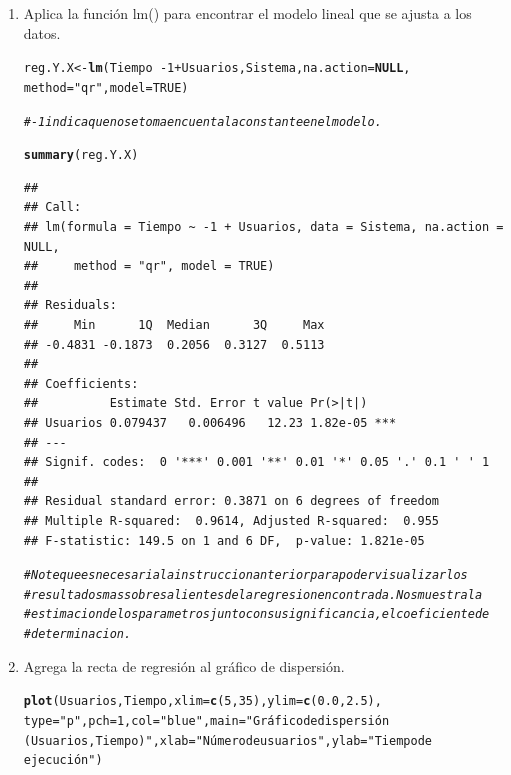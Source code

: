 \documentclass[12pt,letterpaper]{article}\usepackage[]{graphicx}\usepackage[]{color}
\makeatletter
\newcommand{\hlnum}[1]{\textcolor[rgb]{0.686,0.059,0.569}{#1}}%
\newcommand{\hlstr}[1]{\textcolor[rgb]{0.192,0.494,0.8}{#1}}%
\newcommand{\hlcom}[1]{\textcolor[rgb]{0.678,0.584,0.686}{\textit{#1}}}%
\newcommand{\hlopt}[1]{\textcolor[rgb]{0,0,0}{#1}}%
\newcommand{\hlstd}[1]{\textcolor[rgb]{0.345,0.345,0.345}{#1}}%
\newcommand{\hlkwa}[1]{\textcolor[rgb]{0.161,0.373,0.58}{\textbf{#1}}}%
\newcommand{\hlkwb}[1]{\textcolor[rgb]{0.69,0.353,0.396}{#1}}%
\newcommand{\hlkwc}[1]{\textcolor[rgb]{0.333,0.667,0.333}{#1}}%
\newcommand{\hlkwd}[1]{\textcolor[rgb]{0.737,0.353,0.396}{\textbf{#1}}}%
\newenvironment{kframe}{%
 \def\at@end@of@kframe{}%
 \ifinner\ifhmode%
  \def\at@end@of@kframe{\end{minipage}}%
  \begin{minipage}{\columnwidth}%
 \fi\fi%
 \def\FrameCommand##1{\hskip\@totalleftmargin \hskip-\fboxsep
 \colorbox{shadecolor}{##1}\hskip-\fboxsep
     \hskip-\linewidth \hskip-\@totalleftmargin \hskip\columnwidth}%
 \MakeFramed {\advance\hsize-\width
   \@totalleftmargin\z@ \linewidth\hsize
   \@setminipage}}%
 {\par\unskip\endMakeFramed%
 \at@end@of@kframe}
\newenvironment{knitrout}{}{} %
\makeatother
\begin{document}
\begin{enumerate}
\item Aplica la funci\'on lm() para encontrar el modelo lineal que se ajusta a los datos. 

\begin{knitrout}
\color{fgcolor}\begin{kframe}
\begin{alltt}
\hlstd{reg.Y.X} \hlkwb{<-} \hlkwd{lm}\hlstd{(Tiempo} \hlopt{~ -}\hlnum{1} \hlopt{+} \hlstd{Usuarios, Sistema,} \hlkwc{na.action}\hlstd{=}\hlkwa{NULL}\hlstd{,}
              \hlkwc{method}\hlstd{=}\hlstr{"qr"}\hlstd{,} \hlkwc{model}\hlstd{=}\hlnum{TRUE}\hlstd{)}

\hlcom{#-1 indica que no se toma en cuenta la constante en el modelo. }

\hlkwd{summary}\hlstd{(reg.Y.X)}
\end{alltt}
\begin{verbatim}
## 
## Call:
## lm(formula = Tiempo ~ -1 + Usuarios, data = Sistema, na.action = NULL, 
##     method = "qr", model = TRUE)
## 
## Residuals:
##     Min      1Q  Median      3Q     Max 
## -0.4831 -0.1873  0.2056  0.3127  0.5113 
## 
## Coefficients:
##          Estimate Std. Error t value Pr(>|t|)    
## Usuarios 0.079437   0.006496   12.23 1.82e-05 ***
## ---
## Signif. codes:  0 '***' 0.001 '**' 0.01 '*' 0.05 '.' 0.1 ' ' 1
## 
## Residual standard error: 0.3871 on 6 degrees of freedom
## Multiple R-squared:  0.9614,	Adjusted R-squared:  0.955 
## F-statistic: 149.5 on 1 and 6 DF,  p-value: 1.821e-05
\end{verbatim}
\begin{alltt}
\hlcom{# Note que es necesaria la instruccion anterior para poder visualizar los }
\hlcom{# resultados mas sobre salientes de la regresion encontrada. Nos muestra la}
\hlcom{# estimacion de los parametros junto con su significancia, el coeficiente de}
\hlcom{# determinacion. }
\end{alltt}
\end{kframe}
\end{knitrout}

\item Agrega la recta de regresi\'on al gr\'afico de dispersi\'on.

\begin{knitrout}
\color{fgcolor}\begin{kframe}
\begin{alltt}
\hlkwd{plot}\hlstd{(Usuarios, Tiempo,} \hlkwc{xlim}\hlstd{=} \hlkwd{c}\hlstd{(}\hlnum{5}\hlstd{,} \hlnum{35}\hlstd{),} \hlkwc{ylim}\hlstd{=} \hlkwd{c}\hlstd{(}\hlnum{0.0}\hlstd{,} \hlnum{2.5}\hlstd{),}
\hlkwc{type} \hlstd{=} \hlstr{"p"}\hlstd{,} \hlkwc{pch}\hlstd{=}\hlnum{1}\hlstd{,} \hlkwc{col} \hlstd{=} \hlstr{"blue"}\hlstd{,} \hlkwc{main} \hlstd{=} \hlstr{"Gráfico de dispersión 
(Usuarios, Tiempo)"}\hlstd{,} \hlkwc{xlab}\hlstd{=}\hlstr{"Número de usuarios"}\hlstd{,} \hlkwc{ylab}\hlstd{=}\hlstr{"Tiempo de 
ejecución"}\hlstd{)}


\end{alltt}
\end{kframe}
\end{knitrout}
\end{enumerate}
\end{document}
